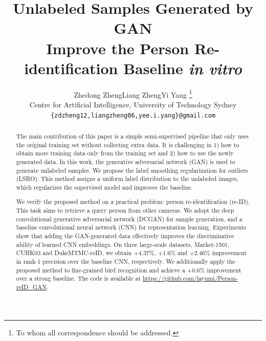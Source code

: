 \documentclass[10pt,twocolumn,letterpaper]{article}
\begin{document}
\title{Unlabeled Samples Generated by GAN \\ Improve the Person Re-identification Baseline \emph{in vitro}}

\author{Zhedong Zheng\qquad Liang Zheng\qquad Yi Yang \thanks{To whom all correspondence should be addressed.} \\
Centre for Artificial Intelligence, University of Technology Sydney\\ 
{\tt\small \{zdzheng12,liangzheng06,yee.i.yang\}@gmail.com}
}

\maketitle
\thispagestyle{empty}


\begin{abstract}
The main contribution of this paper is a simple semi-supervised pipeline that only uses the original training set without collecting extra data. It is challenging in 1) how to obtain more training data only from the training set and 2) how to use the newly generated data. In this work, the generative adversarial network (GAN) is used to generate unlabeled samples. We propose the label smoothing regularization for outliers (LSRO). This method assigns a uniform label distribution to the unlabeled images, which regularizes the supervised model and improves the baseline.

We verify the proposed method on a practical problem: person re-identification (re-ID). This task aims to retrieve a query person from other cameras. We adopt the deep convolutional generative adversarial network (DCGAN) for sample generation, and a baseline convolutional neural network (CNN) for representation learning. Experiments show that adding the GAN-generated data effectively improves the discriminative ability of learned CNN embeddings. On three large-scale datasets, Market-1501, CUHK03 and DukeMTMC-reID, we obtain +4.37\%, +1.6\% and +2.46\% improvement in rank-1 precision over the baseline CNN, respectively. We additionally apply the proposed method to fine-grained bird recognition and achieve a +0.6\% improvement over a strong baseline. The code is available at \url{https://github.com/layumi/Person-reID_GAN}.
\end{abstract}
\end{document}
